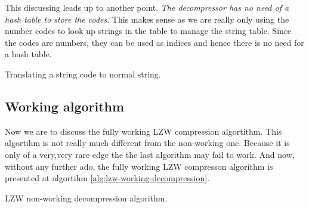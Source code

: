 \begin{refsection}
This discussing leads up to another point. \textit{The decompressor
  has no need of a hash table to store the codes}. This makes sense as
we are really only using the number codes to look up strings in the
table to manage the string table. Since the codes are numbers, they
can be used as indices and hence there is no need for a hash table.

\begin{algorithm}[H]
  \caption{Translating a string code to normal string.}
  \label{alg:translate-string-code}
  \begin{algorithmic}[1]
    \While{\True}

        \Break
      \Else
      \EndIf
    \EndWhile
  \end{algorithmic}
\end{algorithm}

\subsection{Working algorithm}

Now we are to discuss the fully working LZW compression
algortithm. This algortihm is not really much different from the
non-working one. Because it is only of a very,very rare edge the the
last algorithm may fail to work. And now, without any further ado, the
fully working LZW compresson algorithm is presented at algortihm
\ref{alg:lzw-working-decompression}.

\begin{algorithm}[H]
  \caption{LZW non-working decompression algorithm.}
  \label{alg:lzw-working-decompression}
  \begin{algorithmic}[1]
    \State {}



      \Else
      \EndIf

      \State {}


\end{algorithmic}
\end{algorithm}
\end{refsection}
